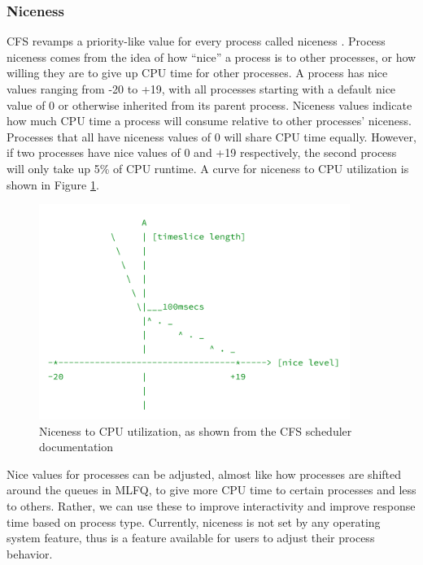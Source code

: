 \documentclass[12pt]{article}
\def\ind{\hspace*{0.3in}}
\begin{document}
\subsubsection*{Niceness}

\ind CFS revamps a priority-like value for every process called niceness \cite{InfluenceSchedulingPriority2006}. Process niceness comes from the idea of how ``nice'' a process is to other processes, or how willing they are to give up CPU time for other processes. A process has nice values ranging from -20 to +19, with all processes starting with a default nice value of 0 or otherwise inherited from its parent process. Niceness values indicate how much CPU time a process will consume relative to other processes' niceness. Processes that all have niceness values of 0 will share CPU time equally. However, if two processes have nice values of 0 and +19 respectively, the second process will only take up 5\% of CPU runtime. A curve for niceness to CPU utilization is shown in Figure \ref{fig:niceness}.

\begin{figure}
    \centering
    \includegraphics[width=0.9\textwidth]{images/niceness.png}
    \caption{Niceness to CPU utilization, as shown from the CFS scheduler documentation \cite{DocumentationSchedulerSchednicedesign}}
    \label{fig:niceness}
\end{figure}

Nice values for processes can be adjusted, almost like how processes are shifted around the queues in MLFQ, to give more CPU time to certain processes and less to others. Rather, we can use these to improve interactivity and improve response time based on process type. Currently, niceness is not set by any operating system feature, thus is a feature available for users to adjust their process behavior. 
\end{document}
